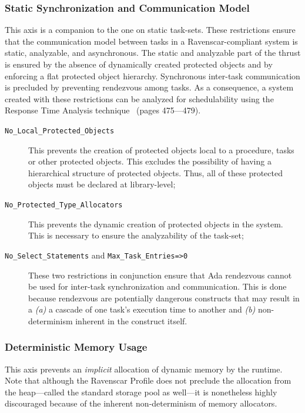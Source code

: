 \subsubsection{Static Synchronization and Communication Model}
This axis is a companion to the one on static task-sets. These
restrictions ensure that the communication model between tasks in a
Ravenscar-compliant system is static, analyzable, and
asynchronous. The static and analyzable part of the thrust is ensured
by the absence of dynamically created protected objects and by
enforcing a flat protected object hierarchy. Synchronous inter-task
communication is precluded by preventing rendezvous among tasks. As a
consequence, a system created with these restrictions can be analyzed
for schedulability using the Response Time Analysis
technique~\cite{burns-rtspl} (pages 475---479).

\begin{description}
\item[\texttt{No\_Local\_Protected\_Objects}] This prevents the
creation of protected objects local to a procedure, tasks or other
protected objects. This excludes the possibility of having a
hierarchical structure of protected objects. Thus, all of these
protected objects must be declared at library-level;

\item[\texttt{No\_Protected\_Type\_Allocators}] This prevents the
  dynamic creation of protected objects in the system. This is
  necessary to ensure the analyzability of the task-set;

\item[\texttt{No\_Select\_Statements} and
  \texttt{Max\_Task\_Entries=>0}] These two restrictions in
  conjunction ensure that Ada rendezvous cannot be used for inter-task
  synchronization and communication. This is done because rendezvous
  are potentially dangerous constructs that may result in a \emph{(a)}
  a cascade of one task's execution time to another and \emph{(b)}
  non-determinism inherent in the construct itself.
\end{description}

\subsubsection{Deterministic Memory Usage}
This axis prevents an \emph{implicit} allocation of dynamic memory by
the runtime. Note that although the Ravenscar Profile does not
preclude the allocation from the heap---called the standard storage
pool as well---it is nonetheless highly discouraged because of the
inherent non-determinism of memory allocators.

